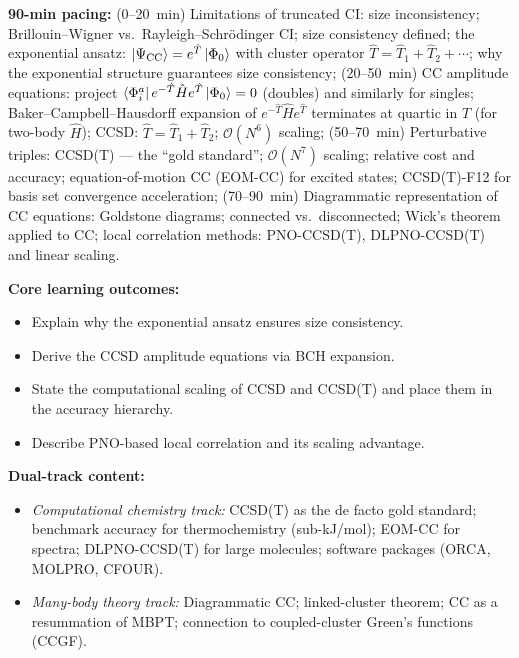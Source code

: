 \documentclass[11pt,a4paper]{article}
\begin{document}
\begin{tcolorbox}[modulebox, title={Module~II.1 / L04: Coupled-Cluster Methods}]
\textbf{90-min pacing:} (0--20~min) Limitations of truncated CI: size inconsistency;
Brillouin--Wigner vs.\ Rayleigh--Schr\"odinger CI; size consistency defined;
the exponential ansatz: $\ket{\Psi_{\rm CC}}=e^{\hat{T}}\ket{\Phi_0}$ with cluster
operator $\hat{T}=\hat{T}_1+\hat{T}_2+\cdots$;
why the exponential structure guarantees size consistency;
(20--50~min) CC amplitude equations: project $\bra{\Phi_i^a}e^{-\hat{T}}\hat{H}e^{\hat{T}}\ket{\Phi_0}=0$
(doubles) and similarly for singles; Baker--Campbell--Hausdorff expansion of $e^{-\hat{T}}\hat{H}e^{\hat{T}}$
terminates at quartic in $\hat{T}$ (for two-body $\hat{H}$);
CCSD: $\hat{T}=\hat{T}_1+\hat{T}_2$; $\mathcal{O}(N^6)$ scaling;
(50--70~min) Perturbative triples: CCSD(T) --- the ``gold standard'';
$\mathcal{O}(N^7)$ scaling; relative cost and accuracy;
equation-of-motion CC (EOM-CC) for excited states; CCSD(T)-F12 for basis set
convergence acceleration;
(70--90~min) Diagrammatic representation of CC equations: Goldstone diagrams;
connected vs.\ disconnected; Wick's theorem applied to CC;
local correlation methods: PNO-CCSD(T), DLPNO-CCSD(T) and linear scaling.

\medskip\textbf{Core learning outcomes:}
\begin{itemize}[leftmargin=1.4em,topsep=2pt,itemsep=1pt]
  \item Explain why the exponential ansatz ensures size consistency.
  \item Derive the CCSD amplitude equations via BCH expansion.
  \item State the computational scaling of CCSD and CCSD(T) and place them in the accuracy hierarchy.
  \item Describe PNO-based local correlation and its scaling advantage.
\end{itemize}

\medskip\textbf{Dual-track content:}
\begin{itemize}[leftmargin=1.4em,topsep=2pt,itemsep=1pt]
  \item \textit{Computational chemistry track:} CCSD(T) as the de facto gold standard;
    benchmark accuracy for thermochemistry (sub-kJ/mol); EOM-CC for spectra;
    DLPNO-CCSD(T) for large molecules; software packages (ORCA, MOLPRO, CFOUR).
  \item \textit{Many-body theory track:} Diagrammatic CC; linked-cluster theorem;
    CC as a resummation of MBPT; connection to coupled-cluster Green's functions (CCGF).
\end{itemize}


\end{tcolorbox}
\end{document}
